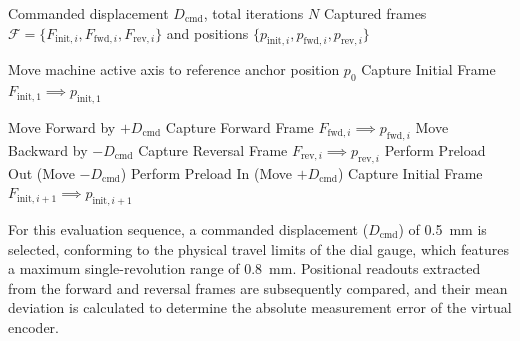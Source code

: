 \begin{algorithm}[t]
	\caption{Data Capturing Sequence for Kinematic Error Extraction}
	\label{alg:sequence}
	\begin{algorithmic}[1]
		\footnotesize
		
		\Require Commanded displacement $D_{\text{cmd}}$, total iterations $N$
		\Ensure Captured frames $\mathcal{F} = \{F_{\text{init}, i}, F_{\text{fwd}, i}, F_{\text{rev}, i}\}$ and
		\Statex \hspace{2.5em} positions $\{p_{\text{init}, i}, p_{\text{fwd}, i}, p_{\text{rev}, i}\}$
		
		\State Move machine active axis to reference anchor position $p_0$
		\State Capture Initial Frame $F_{\text{init}, 1} \implies p_{\text{init}, 1}$
		
		\State Move Forward by $+D_{\text{cmd}}$
		\State Capture Forward Frame $F_{\text{fwd}, i} \implies p_{\text{fwd}, i}$
		\State Move Backward by $-D_{\text{cmd}}$
		\State Capture Reversal Frame $F_{\text{rev}, i} \implies p_{\text{rev}, i}$
		\State Perform Preload Out (Move $-D_{\text{cmd}}$)
		\State Perform Preload In (Move $+D_{\text{cmd}}$)
		\State Capture Initial Frame $F_{\text{init}, i+1} \implies p_{\text{init}, i+1}$
		\EndIf
		\EndFor
		
	\end{algorithmic}
\end{algorithm}

For this evaluation sequence, a commanded displacement ($D_{\text{cmd}}$) of 0.5~mm is selected, conforming to the physical travel limits of the dial gauge, which features a maximum single-revolution range of 0.8~mm. Positional readouts extracted from the forward and reversal frames are subsequently compared, and their mean deviation is calculated to determine the absolute measurement error of the virtual encoder.

